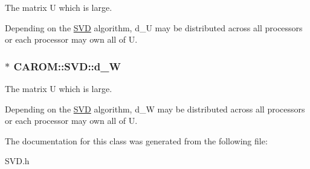 The matrix U which is large. 

Depending on the \hyperlink{class_c_a_r_o_m_1_1_s_v_d}{S\-V\-D} algorithm, d\-\_\-\-U may be distributed across all processors or each processor may own all of U. \hypertarget{class_c_a_r_o_m_1_1_s_v_d_adb215548e00558097e34d4afad15035b}{
\subsubsection[{d\-\_\-\-W}]{$\ast$ C\-A\-R\-O\-M\-::\-S\-V\-D\-::d\-\_\-\-W\hspace{0.3cm}{\ttfamily [protected]}}}\label{class_c_a_r_o_m_1_1_s_v_d_adb215548e00558097e34d4afad15035b}


The matrix U which is large. 

Depending on the \hyperlink{class_c_a_r_o_m_1_1_s_v_d}{S\-V\-D} algorithm, d\-\_\-\-W may be distributed across all processors or each processor may own all of U. 

The documentation for this class was generated from the following file\-:\begin{DoxyCompactItemize}
\item 
S\-V\-D.\-h\end{DoxyCompactItemize}
